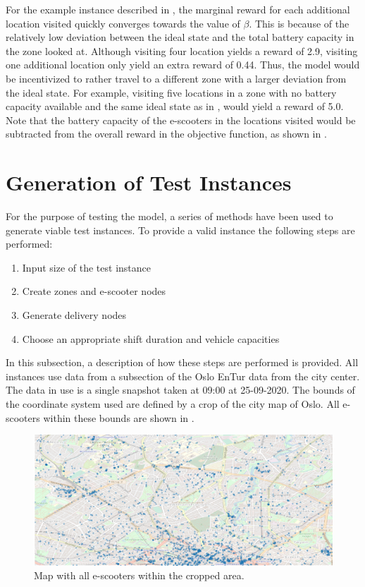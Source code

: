 For the example instance described in , the marginal reward for each additional location visited quickly converges towards the value of $\beta$. This is  because of the relatively low deviation between the ideal state and the total battery capacity in the zone looked at. Although visiting four location yields a reward of 2.9, visiting one additional location only yield an extra reward of 0.44. Thus, the model would be incentivized to rather travel to a different zone with a larger deviation from the ideal state. For example, visiting five locations in a zone with no battery capacity available and the same ideal state as in , would yield a reward of 5.0. Note that the battery capacity of the e-scooters in the locations visited would be subtracted from the overall reward in the objective function, as shown in .
    

\section{Generation of Test Instances}\label{gen_test_inst}
For the purpose of testing the model, a series of methods have been used to generate viable test instances. To provide a valid instance the following steps are performed:
\begin{enumerate}
    \item Input size of the test instance
    \item Create zones and e-scooter nodes
    \item Generate delivery nodes
    \item Choose an appropriate shift duration and vehicle capacities
\end{enumerate}
In this subsection, a description of how these steps are performed is provided. All instances use data from a subsection of the Oslo EnTur data from the city center. The data in use is a single snapshot taken at 09:00 at 25-09-2020. The bounds of the coordinate system used are defined by a crop of the city map of Oslo. All e-scooters within these bounds are shown in .
\\
\begin{figure}[h]
    \centering
    \includegraphics[width=0.8\columnwidth]{Images/all_data.png}
    \caption{Map with all e-scooters within the cropped area.}
    \label{fig:all_data}
\end{figure}

